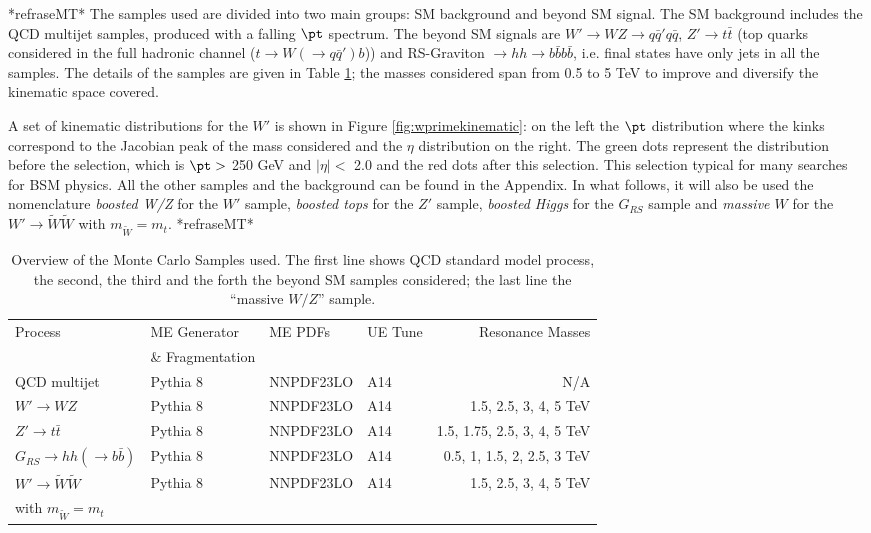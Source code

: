 \documentclass[UKenglish,texlive=2013]{\ATLASLATEXPATH atlasdoc}
\begin{document}
*refraseMT*
The samples used are divided into two main groups: SM background and beyond SM signal. The SM background includes the QCD multijet samples, produced with a falling $\pt$ spectrum. The beyond SM signals are $W'\to WZ\to q\bar{q}'q\bar{q}$, $Z'\to t\bar{t}$ (top quarks considered in the full hadronic channel ($t\to W(\to q\bar{q}')b$)) and RS-Graviton $\to hh \to b\bar{b}b\bar{b}$, i.e. final states have only jets in all the samples. The details of the samples are given in Table \ref{tab:mcsamples}; the masses considered span from 0.5 to 5 TeV to improve and diversify the kinematic space covered.

A set of kinematic distributions for the $W'$ is shown in Figure \ref{fig:wprimekinematic}: on the left the $\pt$ distribution where the kinks correspond to the Jacobian peak of the mass considered and the $\eta$ distribution on the right. The green dots represent the distribution before the selection, which is $\pt >$ 250 GeV and $|\eta|<$ 2.0 and the red dots after this selection. This selection typical for many searches for BSM physics.  All the other samples and the background can be found in the Appendix. 
In what follows, it will also be used the nomenclature \textit{boosted W/Z} for the $W'$ sample, \textit{boosted tops} for the $Z'$ sample, \textit{boosted Higgs} for the $G_{RS}$ sample and \textit{massive $W$} for the $W' \to \tilde{W}\tilde{W}$ with $m_{\tilde{W}}=m_t$.
*refraseMT*

\begin{table}
\centering
\hspace*{-3em}\begin{tabular}{l|lllr}  
\hline
\hline
Process & ME Generator & ME PDFs &  UE Tune & Resonance Masses\\
  & \& Fragmentation &  & & \\

\hline
QCD multijet &Pythia 8&NNPDF23LO & A14& N/A \\
\hline
$W'\to WZ$ &Pythia 8&NNPDF23LO & A14& 1.5, 2.5, 3, 4, 5 TeV \\
\cline{1-1}
$Z'\to t\bar{t}$ &Pythia 8&NNPDF23LO & A14& 1.5, 1.75, 2.5, 3, 4, 5 TeV \\
\cline{1-1}
$G_{RS} \to hh(\to b\bar{b})$ &Pythia 8&NNPDF23LO & A14& 0.5, 1, 1.5, 2, 2.5, 3 TeV\\
\cline{1-1}
$W' \to \tilde{W}\tilde{W}$ &Pythia 8&NNPDF23LO & A14& 1.5, 2.5, 3, 4, 5 TeV \\
with $m_{\tilde{W}}=m_t$ & & & & \\
\hline
\hline
\end{tabular}
\caption[Overview of the Monte Carlo Samples used]{Overview of the Monte Carlo Samples used. The first line shows QCD standard model process, the second, the third and the forth the beyond SM samples considered; the last line the ``massive $W/Z$'' sample.}
\label{tab:mcsamples}
\end{table}
\end{document}
